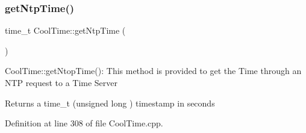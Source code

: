 \subsubsection{\texorpdfstring{get\+Ntp\+Time()}{getNtpTime()}}
{\footnotesize\ttfamily time\+\_\+t Cool\+Time\+::get\+Ntp\+Time (\begin{DoxyParamCaption}{ }\end{DoxyParamCaption})}

Cool\+Time\+::get\+Ntop\+Time()\+: This method is provided to get the Time through an N\+TP request to a Time Server

\begin{DoxyReturn}{Returns}
a time\+\_\+t (unsigned long ) timestamp in seconds 
\end{DoxyReturn}


Definition at line 308 of file Cool\+Time.\+cpp.


